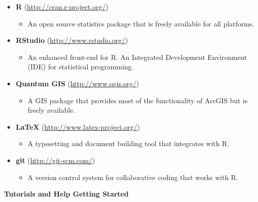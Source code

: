 \documentclass{article}
\begin{document}
\begin{itemize}
  \item \textbf{R} (\href{http://cran.r-project.org/}{http://cran.r-project.org/})
    \begin{itemize}
    \item An open source statistics package that is freely available for all platforms.
    \end{itemize}
  \item \textbf{RStudio} (\href{http://www.rstudio.org/}{http://www.rstudio.org/})
    \begin{itemize}
    \item An enhanced front-end for R. An Integrated Development Environment (\textsc{IDE}) for statistical programming.
    \end{itemize}
  \item \textbf{Quantum GIS} (\href{http://www.qgis.org/}{http://www.qgis.org/})
    \begin{itemize}
    \item A GIS package that provides most of the functionality of ArcGIS but is freely available.
    \end{itemize}
  \item \textbf{\LaTeX{}} (\href{http://www.latex-project.org/}{http://www.latex-project.org/})
    \begin{itemize}
    \item A typesetting and document building tool that integrates with R.
    \end{itemize}
  \item \textbf{git} 
  (\href{http://git-scm.com/}{http://git-scm.com/})
    \begin{itemize}
    \item A version control system for collaborative coding that works with R.
    \end{itemize}    

\end{itemize}

\vspace{.15in}

\textbf{Tutorials and Help Getting Started}
\end{document}
